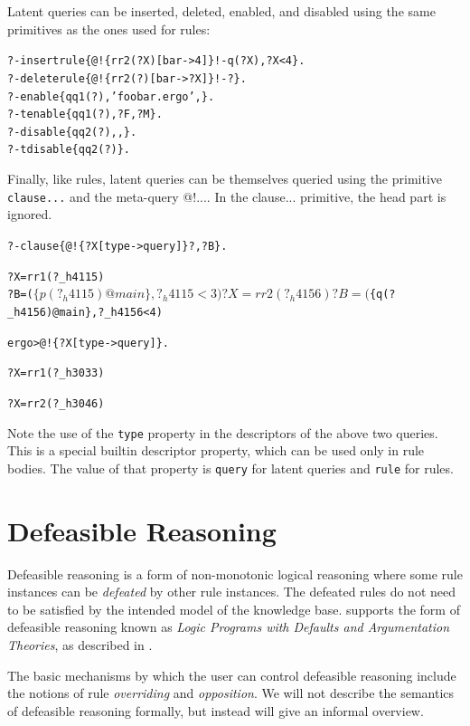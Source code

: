 \documentclass[11pt]{article}
\newcommand{\ERGO}{\mbox{\smaller{\ensuremath{\cal{E}}\smaller{{\sc{RGO}}}}}\xspace}
\newcommand{\FLSYSTEM}{\ERGO}
\newcommand{\prompt}{ergo> }
\newcommand{\ergoext}{ergo\xspace}
\begin{document}
Latent queries can be inserted, deleted, enabled, and disabled using the
same primitives as the ones used for rules:
\begin{alltt}
 ?- insertrule\{@!\{rr2(?X)[bar->4]\} !- q(?X), ?X<4\}.
 ?- deleterule\{@!\{rr2(?)[bar->?X]\} !- ?\}.
 ?- enable\{qq1(?),'foobar.\ergoext',\@\}.
 ?- tenable\{qq1(?),?F,?M\}.
 ?- disable\{qq2(?),\@F,\@\}.
 ?- tdisable\{qq2(?)\}.
\end{alltt}

Finally, like rules, latent queries can be themselves queried using the
primitive \texttt{clause{...}}  and the meta-query @!{...}. In the
clause{...} primitive, the head part is ignored.
\begin{alltt}
  ?- clause\{@!\{?X[type->query]\} ?,?B\}.

  ?X = rr1(?_h4115)
  ?B = ($\{p(?_h4115)@main\}, ?_h4115 < 3)

  ?X = rr2(?_h4156)
  ?B = ($\{q(?_h4156)@main\}, ?_h4156 < 4)

  \prompt @!\{?X[type->query]\}.

  ?X = rr1(?_h3033)

  ?X = rr2(?_h3046)
\end{alltt}
Note the use of the \texttt{type} property in the descriptors of the above
two queries. This is a special builtin descriptor property, which can be
used only in rule bodies. The value of that property is \texttt{query} for
latent queries and \texttt{rule} for rules.  





\section{Defeasible Reasoning}
\label{sec-defeasible}

Defeasible reasoning is a form of non-monotonic logical reasoning where
some rule instances can be \emph{defeated} by other rule instances. The
defeated rules do not need to be satisfied by the intended model of the
knowledge base. \FLSYSTEM supports the form of defeasible reasoning known as
\emph{Logic Programs with Defaults and Argumentation Theories}, as
described in \cite{lpda-iclp-09}.  

The basic mechanisms by which the user can control defeasible
reasoning include the notions of rule \emph{overriding} and 
\emph{opposition}.  We will not describe the semantics of defeasible
reasoning formally, but instead will give an informal overview.
\end{document}
